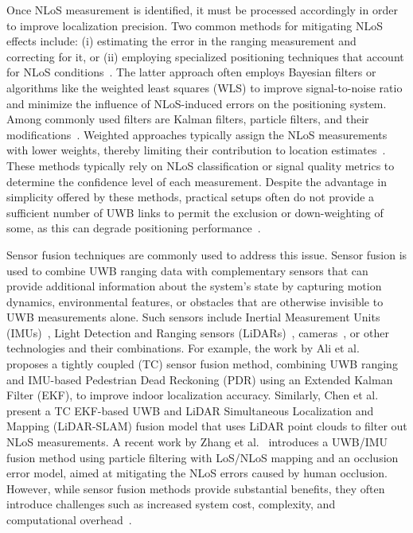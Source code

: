 Once NLoS measurement is identified, it must be processed accordingly in order to improve localization precision. Two common methods for mitigating NLoS effects include: (i) estimating the error in the ranging measurement and correcting for it, or (ii) employing specialized positioning techniques that account for NLoS conditions~\cite{yu2018novel}. The latter approach often employs Bayesian filters or algorithms like the weighted least squares (WLS) to improve signal-to-noise ratio and minimize the influence of NLoS-induced errors on the positioning system. Among commonly used filters are Kalman filters, particle filters, and their modifications~\cite{Wang2023NLoS}. Weighted approaches typically assign the NLoS measurements with lower weights, thereby limiting their contribution to location estimates~\cite{Wang2023NLoS}. These methods typically rely on NLoS classification or signal quality metrics to determine the confidence level of each measurement. Despite the advantage in simplicity offered by these methods, practical setups often do not provide a sufficient number of UWB links to permit the exclusion or down-weighting of some, as this can degrade positioning performance~\cite{ferreira2021feature}.

Sensor fusion techniques are commonly used to address this issue. Sensor fusion is used to combine UWB ranging data with complementary sensors that can provide additional information about the system's state by capturing motion dynamics, environmental features, or obstacles that are otherwise invisible to UWB measurements alone. Such sensors include Inertial Measurement Units (IMUs)~\cite{Kim2021IMU}, Light Detection and Ranging sensors (LiDARs)~\cite{Chen2022LIDAR}, cameras~\cite{Peng2022Visual}, or other technologies and their combinations. For example, the work by Ali et al.~\cite{Ali2021IMU} proposes a tightly coupled (TC) sensor fusion method, combining UWB ranging and IMU-based Pedestrian Dead Reckoning (PDR) using an Extended Kalman Filter (EKF), to improve indoor localization accuracy. Similarly, Chen et al.~\cite{Chen2022LIDAR} present a TC EKF-based UWB and LiDAR Simultaneous Localization and Mapping (LiDAR-SLAM) fusion model that uses LiDAR point clouds to filter out NLoS measurements. A recent work by Zhang et al.~\cite{zhang2023research} introduces a UWB/IMU fusion method using particle filtering with LoS/NLoS mapping and an occlusion error model, aimed at mitigating the NLoS errors caused by human occlusion. However, while sensor fusion methods provide substantial benefits, they often introduce challenges such as increased system cost, complexity, and computational overhead~\cite{Naheem2022IMU, wang2024comprehensive}.

